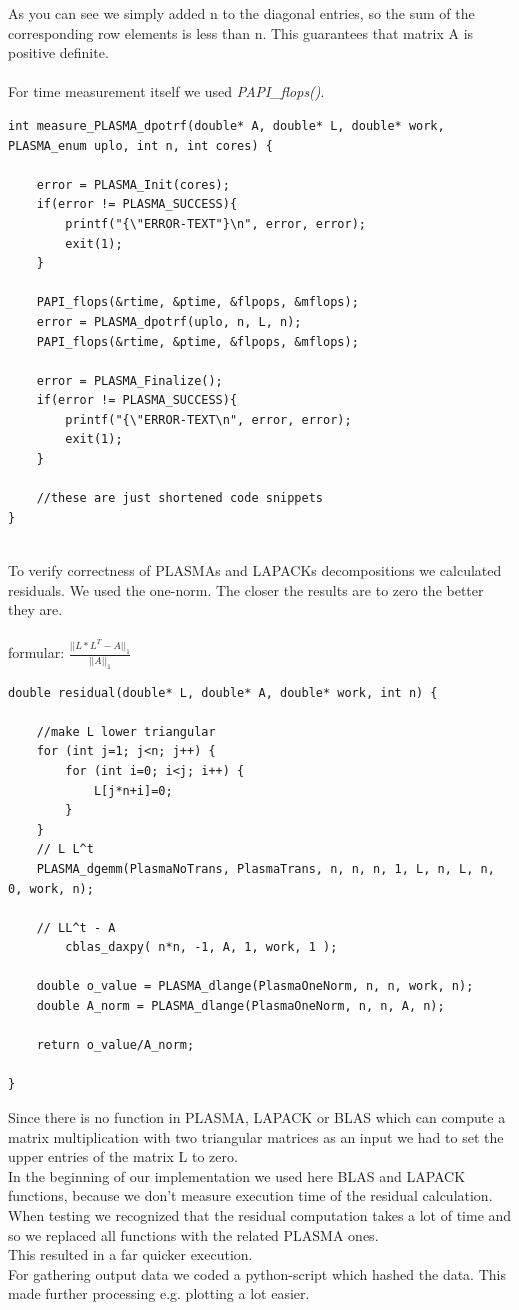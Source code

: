 \documentclass[a4paper,final,ngerman,english]{article}
\begin{document}
As you can see we simply added n to the diagonal entries, so the sum of the corresponding row elements is less than n. This guarantees that matrix A is positive definite.\\
\ \\
For time measurement itself we used \textit{PAPI\_flops()}.
\begin{lstlisting}
int measure_PLASMA_dpotrf(double* A, double* L, double* work, PLASMA_enum uplo, int n, int cores) {

	error = PLASMA_Init(cores);
	if(error != PLASMA_SUCCESS){
		printf("{\"ERROR-TEXT"}\n", error, error);
		exit(1);
	}

	PAPI_flops(&rtime, &ptime, &flpops, &mflops);
	error = PLASMA_dpotrf(uplo, n, L, n);
	PAPI_flops(&rtime, &ptime, &flpops, &mflops);

	error = PLASMA_Finalize();
	if(error != PLASMA_SUCCESS){
		printf("{\"ERROR-TEXT\n", error, error);
		exit(1);
	}
	
	//these are just shortened code snippets
}
\end{lstlisting}
\ \\
To verify correctness of PLASMAs and LAPACKs decompositions we calculated residuals.
We used the one-norm. The closer the results are to zero the better they are.\\
\ \\
formular:
\(\frac{||L*L^T-A||_1}{||A||_1}\)\\


\begin{lstlisting}
double residual(double* L, double* A, double* work, int n) {

	//make L lower triangular
	for (int j=1; j<n; j++) {
		for (int i=0; i<j; i++) {
			L[j*n+i]=0;
		}
	}
	// L L^t
	PLASMA_dgemm(PlasmaNoTrans, PlasmaTrans, n, n, n, 1, L, n, L, n, 0, work, n);

	// LL^t - A
    	cblas_daxpy( n*n, -1, A, 1, work, 1 );

	double o_value = PLASMA_dlange(PlasmaOneNorm, n, n, work, n);
	double A_norm = PLASMA_dlange(PlasmaOneNorm, n, n, A, n);

	return o_value/A_norm;

}
\end{lstlisting}
Since there is no function in PLASMA, LAPACK or BLAS which can compute a matrix multiplication with two triangular matrices as an input we had to set the upper entries of the matrix L to zero.\\
In the beginning of our implementation we used here BLAS and LAPACK functions, because we don't measure execution time of the residual calculation. When testing we recognized that the residual computation takes a lot of time and so we replaced all functions with the related PLASMA ones.\\
This resulted in a far quicker execution.
\ \\
For gathering output data we coded a python-script which hashed the data. This made further processing e.g. plotting a lot easier.
\end{document}
